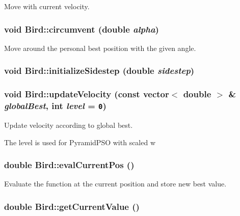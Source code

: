 Move with current velocity. 

\hypertarget{classBird_3834db8ea6e9f92188bfdef44c4ccdc2}{
\subsubsection{\setlength{\rightskip}{0pt plus 5cm}void Bird::circumvent (double {\em alpha})}}
\label{classBird_3834db8ea6e9f92188bfdef44c4ccdc2}


Move around the personal best position with the given angle. 

\hypertarget{classBird_618371d1ca2da9ff13657855dda09a85}{
\subsubsection{\setlength{\rightskip}{0pt plus 5cm}void Bird::initializeSidestep (double {\em sidestep})}}
\label{classBird_618371d1ca2da9ff13657855dda09a85}


\hypertarget{classBird_96328be626963fe73475a97290ffb54c}{
\subsubsection{\setlength{\rightskip}{0pt plus 5cm}void Bird::updateVelocity (const vector$<$ double $>$ \& {\em globalBest}, \/  int {\em level} = {\tt 0})}}
\label{classBird_96328be626963fe73475a97290ffb54c}


Update velocity according to global best. 

The level is used for PyramidPSO with scaled w \hypertarget{classBird_1bd5c0e3711cd3aae93a0eeee0fd6c15}{
\subsubsection{\setlength{\rightskip}{0pt plus 5cm}double Bird::evalCurrentPos ()}}
\label{classBird_1bd5c0e3711cd3aae93a0eeee0fd6c15}


Evaluate the function at the current position and store new best value. 

\hypertarget{classBird_bf844d57c7542b2bd8dba8d8aae84b96}{
\subsubsection{\setlength{\rightskip}{0pt plus 5cm}double Bird::getCurrentValue ()}}
\label{classBird_bf844d57c7542b2bd8dba8d8aae84b96}


